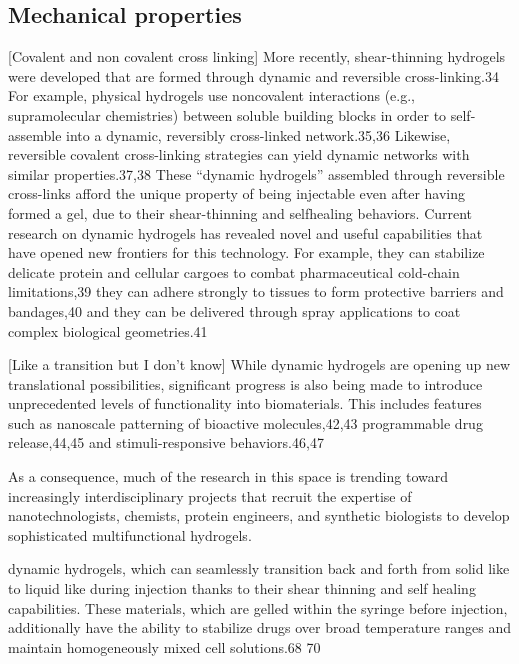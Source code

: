 \subsection{Mechanical properties}

[Covalent and non covalent cross linking]
More recently, shear-thinning hydrogels were developed that  are formed through dynamic and reversible cross-linking.34 
For example, physical hydrogels use noncovalent interactions (e.g., supramolecular chemistries) between soluble building blocks in order to self-assemble into a dynamic, reversibly cross-linked  network.35,36 
Likewise, reversible covalent cross-linking strategies can yield dynamic networks with similar properties.37,38 These “dynamic hydrogels” assembled through reversible cross-links afford the unique property of being injectable even after having formed a gel, due to their shear-thinning and selfhealing behaviors. 
Current research on dynamic hydrogels has revealed novel and useful capabilities that have opened new frontiers for this technology. 
For example, they can stabilize delicate protein and cellular cargoes to combat pharmaceutical  cold-chain limitations,39 they can adhere strongly to tissues to  form protective barriers and bandages,40 and they can be delivered through spray applications to coat complex biological  geometries.41\citep{correaTranslationalApplicationsHydrogels2021}

[Like a transition but I don't know]
While dynamic hydrogels are opening up new translational possibilities, significant progress is also being made to introduce unprecedented levels of functionality into biomaterials. 
This includes features such as nanoscale patterning of  bioactive molecules,42,43 programmable drug release,44,45 and  stimuli-responsive behaviors.46,47\citep{correaTranslationalApplicationsHydrogels2021} 

As a consequence, much of the research in this space is trending toward increasingly interdisciplinary projects that recruit the expertise of nanotechnologists, chemists, protein engineers, and synthetic biologists to develop sophisticated multifunctional hydrogels\citep{correaTranslationalApplicationsHydrogels2021}. 


dynamic hydrogels, which can seamlessly transition back and forth from solid like to liquid like during injection thanks to their shear thinning and self healing capabilities. 
These materials, which are gelled within the syringe before injection, additionally have the ability to stabilize drugs over broad temperature ranges and maintain homogeneously mixed  cell solutions.68 70\citep{correaTranslationalApplicationsHydrogels2021} 



